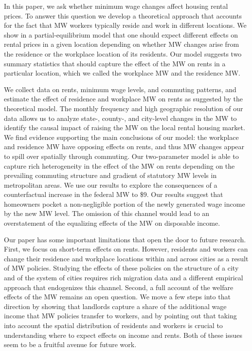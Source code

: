 
In this paper, we ask whether minimum wage changes affect housing rental prices.
To answer this question we develop a theoretical approach that accounts for
the fact that MW workers typically reside and work in different locations.
We show in a partial-equilibrium model that one should expect different effects
on rental prices in a given location depending on whether MW changes arise from 
the residence or the workplace location of its residents.
Our model suggests two summary statistics that should capture the effect of 
the MW on rents in a particular location, which we called the workplace MW and 
the residence MW.

We collect data on rents, minimum wage levels, and commuting patterns, and
estimate the effect of residence and workplace MW on rents as suggested by
the theoretical model.
The monthly frequency and high geographic resolution of our data allows us to 
analyze state-, county-, and city-level changes in the MW to identify the causal 
impact of raising the MW on the local rental housing market.
We find evidence supporting the main conclusions of our model: the workplace and 
residence MW have opposing effects on rents, and thus MW changes appear to 
spill over spatially through commuting.
Our two-parameter model is able to capture rich heterogeneity in the effect 
of the MW on rents depending on the prevailing commuting structure and 
gradient of statutory MW levels in metropolitan areas.
We use our results to explore the consequences of a counterfactual increase 
in the federal MW to \$9.
Our results suggest that homeowners pocket a non-negligible portion of the newly 
generated wage income by the new MW level.
The omission of this channel would lead to an overstatement of the equalizing 
effects of the MW on disposable income.

Our paper has some important limitations that open the door to future research.
First, we focus on short-term effects on rents.
However, residents and workers can change their residence and workplace 
locations within and across cities as a result of MW policies.
Studying the effects of these policies on the structure of a city and of the 
system of cities requires rich migration data and a different empirical approach
that endogenizes this channel.
Second, a full account of the welfare effects of the MW remains an open question.
We move a few steps into that direction by showing that landlords capture a 
share of the additional wage income that MW policies transfer to workers, and 
by pointing out that taking into account the spatial distribution of residents 
and workers is crucial to understanding where to expect effects on income and 
rents.
Both of these issues seem to be a fruitful avenue for future work.
